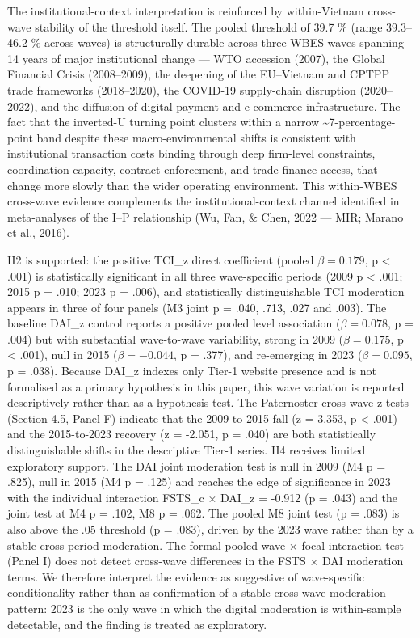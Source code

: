 \documentclass[12pt,a4paper]{article}
\begin{document}
The institutional-context interpretation is reinforced by within-Vietnam
cross-wave stability of the threshold itself. The pooled threshold of
39.7 \% (range 39.3--46.2 \% across waves) is structurally durable
across three WBES waves spanning 14 years of major institutional change
--- WTO accession (2007), the Global Financial Crisis (2008--2009), the
deepening of the EU--Vietnam and CPTPP trade frameworks (2018--2020),
the COVID-19 supply-chain disruption (2020--2022), and the diffusion of
digital-payment and e-commerce infrastructure. The fact that the
inverted-U turning point clusters within a narrow
\textasciitilde7-percentage-point band despite these macro-environmental
shifts is consistent with institutional transaction costs binding
through deep firm-level constraints, coordination capacity, contract
enforcement, and trade-finance access, that change more slowly than the
wider operating environment. This within-WBES cross-wave evidence
complements the institutional-context channel identified in
meta-analyses of the I--P relationship (Wu, Fan, \& Chen, 2022 --- MIR;
Marano et al., 2016).

H2 is supported: the positive TCI\_z direct coefficient (pooled
\(\beta = 0.179\), p \textless{} .001) is statistically significant in
all three wave-specific periods (2009 p \textless{} .001; 2015 p = .010;
2023 p = .006), and statistically distinguishable TCI moderation appears
in three of four panels (M3 joint p = .040, .713, .027 and .003). The
baseline DAI\_z control reports a positive pooled level association
(\(\beta = 0.078\), p = .004) but with substantial wave-to-wave
variability, strong in 2009 (\(\beta = 0.175\), p \textless{} .001),
null in 2015 (\(\beta = -0.044\), p = .377), and re-emerging in 2023
(\(\beta = 0.095\), p = .038). Because DAI\_z indexes only Tier-1
website presence and is not formalised as a primary hypothesis in this
paper, this wave variation is reported descriptively rather than as a
hypothesis test. The Paternoster cross-wave z-tests (Section 4.5, Panel
F) indicate that the 2009-to-2015 fall (z = 3.353, p \textless{} .001)
and the 2015-to-2023 recovery (z = -2.051, p = .040) are both
statistically distinguishable shifts in the descriptive Tier-1 series.
H4 receives limited exploratory support. The DAI joint moderation test
is null in 2009 (M4 p = .825), null in 2015 (M4 p = .125) and reaches
the edge of significance in 2023 with the individual interaction FSTS\_c
× DAI\_z = -0.912 (p = .043) and the joint test at M4 p = .102, M8 p =
.062. The pooled M8 joint test (p = .083) is also above the .05
threshold (p = .083), driven by the 2023 wave rather than by a stable
cross-period moderation. The formal pooled wave × focal interaction test
(Panel I) does not detect cross-wave differences in the FSTS × DAI
moderation terms. We therefore interpret the evidence as suggestive of
wave-specific conditionality rather than as confirmation of a stable
cross-wave moderation pattern: 2023 is the only wave in which the
digital moderation is within-sample detectable, and the finding is
treated as exploratory.
\end{document}
